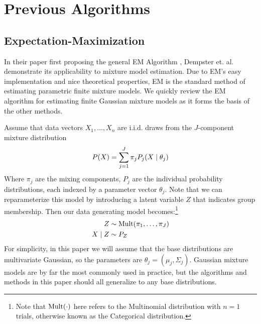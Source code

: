 \documentclass{article}
\newcommand*{\cond}{\;\ifnum\currentgrouptype=16 \middle\fi|\;}
\newcommand*{\mt}[1]{\text{\normalfont #1}}
\newcommand*{\dist}{\sim}
\theoremstyle{definition}
\theoremstyle{algodesc}
\begin{document}
\section{Previous Algorithms} \label{sec:algos}


\subsection{Expectation-Maximization}

In their paper first proposing the general EM Algorithm \cite{dempsterlairdrubin77}, Dempster et. al. demonstrate its applicability to mixture model estimation. Due to EM's easy implementation and nice theoretical properties, EM is the standard method of estimating parametric finite mixture models. We quickly review the EM algorithm for estimating finite Gaussian mixture models as it forms the basis of the other methods.

Assume that data vectors $X_1, \dots, X_n$ are i.i.d. draws from the $J$-component mixture distribution
\begin{equation*}
P(X) = \sum_{j=1}^J \pi_j P_j(X \cond \theta_j)
\end{equation*}
Where $\pi_j$ are the mixing components, $P_j$ are the individual probability distributions, each indexed by a parameter vector $\theta_j$. Note that we can reparameterize this model by introducing a latent variable $Z$ that indicates group membership. Then our data generating model becomes:\footnote{Note that $\mt{Mult}(\cdot)$ here refers to the Multinomial distribution with $n=1$ trials, otherwise known as the Categorical distribution.}
\begin{align*}
Z &\dist \mt{Mult}(\pi_1, \dots, \pi_J) \\
X \cond Z &\dist P_Z
\end{align*}
For simplicity, in this paper we will assume that the base distributions are multivariate Gaussian, so the parameters are $\theta_j = (\mu_j, \Sigma_j)$. Gaussian mixture models are by far the most commonly used in practice, but the algorithms and methods in this paper should all generalize to any base distributions.
\end{document}
